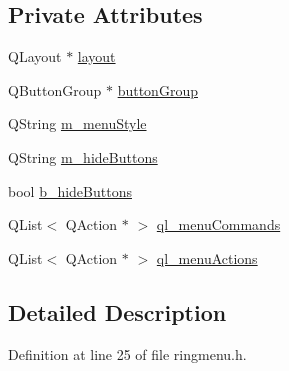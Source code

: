 \subsection*{Private Attributes}
\begin{DoxyCompactItemize}
\item 
QLayout $\ast$ \hyperlink{classRingMenu_af0f01459ece60416bad089171cfe7a2a}{layout}
\item 
QButtonGroup $\ast$ \hyperlink{classRingMenu_af6cb8d6f3b6de7197633c558020dff5d}{buttonGroup}
\item 
QString \hyperlink{classRingMenu_a44e8981a662fcf261033a1b81e8c2c17}{m\_\-menuStyle}
\item 
QString \hyperlink{classRingMenu_af9f395e6f878ed78c19507f1aea10085}{m\_\-hideButtons}
\item 
bool \hyperlink{classRingMenu_aea35804a8279e64176a639c1d16a8be1}{b\_\-hideButtons}
\item 
QList$<$ QAction $\ast$ $>$ \hyperlink{classRingMenu_a019bd2cb1e166b982396829515e7eb81}{ql\_\-menuCommands}
\item 
QList$<$ QAction $\ast$ $>$ \hyperlink{classRingMenu_a5f21339751f39c89451aab407339bbb2}{ql\_\-menuActions}
\end{DoxyCompactItemize}


\subsection{Detailed Description}


Definition at line 25 of file ringmenu.h.



